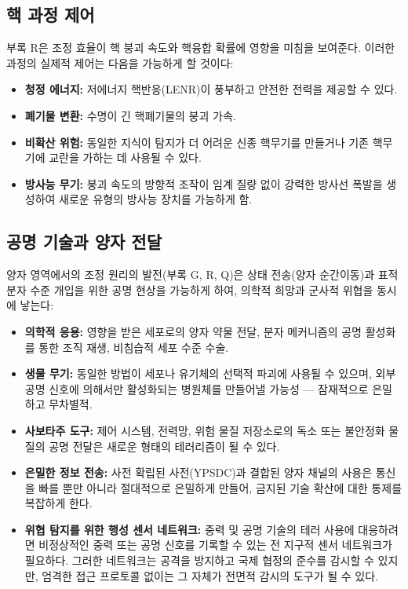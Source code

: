 \documentclass[12pt,a4paper]{article}
\theoremstyle{remark}
\begin{document}
	\subsection{핵 과정 제어}
	\label{subsec:nuclear}
	
	부록 R은 조정 효율이 핵 붕괴 속도와 핵융합 확률에 영향을 미침을 보여준다. 이러한 과정의 실제적 제어는 다음을 가능하게 할 것이다:
	\begin{itemize}[leftmargin=*]
		\item \textbf{청정 에너지:} 저에너지 핵반응(LENR)이 풍부하고 안전한 전력을 제공할 수 있다.
		\item \textbf{폐기물 변환:} 수명이 긴 핵폐기물의 붕괴 가속.
		\item \textbf{비확산 위험:} 동일한 지식이 탐지가 더 어려운 신종 핵무기를 만들거나 기존 핵무기에 교란을 가하는 데 사용될 수 있다.
		\item \textbf{방사능 무기:} 붕괴 속도의 방향적 조작이 임계 질량 없이 강력한 방사선 폭발을 생성하여 새로운 유형의 방사능 장치를 가능하게 함.
	\end{itemize}
	
	\subsection{공명 기술과 양자 전달}
	\label{subsec:resonance}
	
	양자 영역에서의 조정 원리의 발전(부록 G, R, Q)은 상태 전송(양자 순간이동)과 표적 분자 수준 개입을 위한 공명 현상을 가능하게 하여, 의학적 희망과 군사적 위협을 동시에 낳는다:
	\begin{itemize}[leftmargin=*]
		\item \textbf{의학적 응용:} 영향을 받은 세포로의 양자 약물 전달, 분자 메커니즘의 공명 활성화를 통한 조직 재생, 비침습적 세포 수준 수술.
		\item \textbf{생물 무기:} 동일한 방법이 세포나 유기체의 선택적 파괴에 사용될 수 있으며, 외부 공명 신호에 의해서만 활성화되는 병원체를 만들어낼 가능성 — 잠재적으로 은밀하고 무차별적.
		\item \textbf{사보타주 도구:} 제어 시스템, 전력망, 위험 물질 저장소로의 독소 또는 불안정화 물질의 공명 전달은 새로운 형태의 테러리즘이 될 수 있다.
		\item \textbf{은밀한 정보 전송:} 사전 확립된 사전(YPSDC)과 결합된 양자 채널의 사용은 통신을 빠를 뿐만 아니라 절대적으로 은밀하게 만들어, 금지된 기술 확산에 대한 통제를 복잡하게 한다.
		\item \textbf{위협 탐지를 위한 행성 센서 네트워크:} 중력 및 공명 기술의 테러 사용에 대응하려면 비정상적인 중력 또는 공명 신호를 기록할 수 있는 전 지구적 센서 네트워크가 필요하다. 그러한 네트워크는 공격을 방지하고 국제 협정의 준수를 감시할 수 있지만, 엄격한 접근 프로토콜 없이는 그 자체가 전면적 감시의 도구가 될 수 있다.
	\end{itemize}
	
\end{document}
